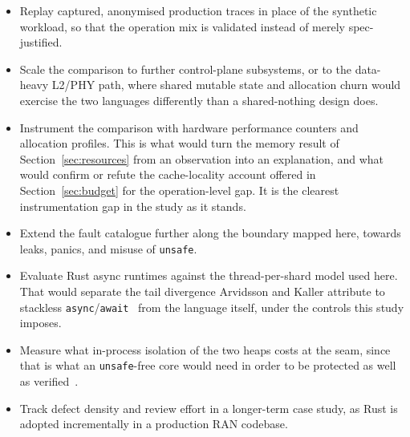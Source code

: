 \documentclass[english,twoside,openright,a4paper,censored,csm,software-track-2020]{HYthesisML}
\begin{document}
\begin{itemize}
\item Replay captured, anonymised production traces in place of the synthetic workload, so that
  the operation mix is validated instead of merely spec-justified.
\item Scale the comparison to further control-plane subsystems, or to the data-heavy L2/PHY
  path, where shared mutable state and allocation churn would exercise the two languages
  differently than a shared-nothing design does.
\item Instrument the comparison with hardware performance counters and allocation profiles. This
  is what would turn the memory result of Section~\ref{sec:resources} from an observation into
  an explanation, and what would confirm or refute the cache-locality account offered in
  Section~\ref{sec:budget} for the operation-level gap. It is the clearest instrumentation gap
  in the study as it stands.
\item Extend the fault catalogue further along the boundary mapped here, towards leaks, panics,
  and misuse of \texttt{unsafe}.
\item Evaluate Rust async runtimes against the thread-per-shard model used here. That would
  separate the tail divergence Arvidsson and Kaller attribute to stackless
  \texttt{async}/\texttt{await}~\cite{arvidsson2025async} from the language itself, under the
  controls this study imposes.
\item Measure what in-process isolation of the two heaps costs at the seam, since that is what
  an \texttt{unsafe}-free core would need in order to be protected as well as
  verified~\cite{rivera2021galeed,kirth2022pkrusafe}.
\item Track defect density and review effort in a longer-term case study, as Rust is adopted
  incrementally in a production RAN codebase.
\end{itemize}


\cleardoublepage %

\printbibliography
\end{document}
